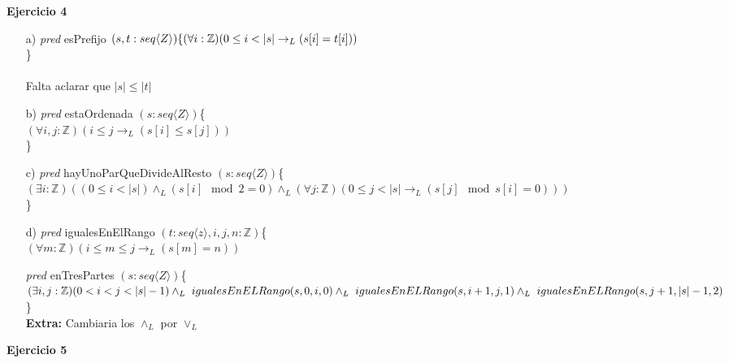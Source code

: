 \documentclass{article}
\begin{document}
\LARGE{\textbf{Ejercicio 4}}
\begin{itemize}
    \item [a)] \Large{\textit{pred} esPrefijo $(s,t:seq\langle Z \rangle)\{\\ (\forall i:\mathbb{Z})(0\leq i < |s| \to_L (s[i]=t[i]))$}\\\}\\\\
    \normalsize{Falta aclarar que $|s|\leq|t|$}

    \item [b)] \Large{\textit{pred} estaOrdenada $(s:seq\langle Z \rangle)$\{\\
    $(\forall i,j:\mathbb{Z})(i\leq j \to_L (s[i]\leq s[j]))$\\\}}
    
    \item [c)] \large{\textit{pred} hayUnoParQueDivideAlResto $(s:seq\langle Z \rangle)$\{\\
    $(\exists i:\mathbb{Z})((0\leq i < |s|)\land_L(s[i] \mod 2 = 0)\land_L(\forall j:\mathbb{Z})(0\leq j <|s| \to_L(s[j] \mod s[i] =0)))$}\\\}

    \item[d)] \large{\textit{pred} igualesEnElRango $(t:seq\langle z\rangle,i,j,n:\mathbb{Z})$\{\\
    $(\forall m:\mathbb{Z})(i\leq m \leq j \to_L (s[m]=n))$}
    
    \large{\textit{pred} enTresPartes $(s:seq\langle Z \rangle)$\{\\
    $(\exists i,j:\mathbb{Z})(0<i<j<|s|-1)\land_L \\\ igualesEnELRango(s,0,i,0)\land_L \\\ igualesEnELRango(s,i+1,j,1)\land_L \\\ igualesEnELRango(s,j+1,|s|-1,2)$\\\}\\ 
    \textbf{Extra: }Cambiaria los $\land_L$ por $\lor_L$}
\end{itemize}
\LARGE{\textbf{Ejercicio 5}}
\end{document}
